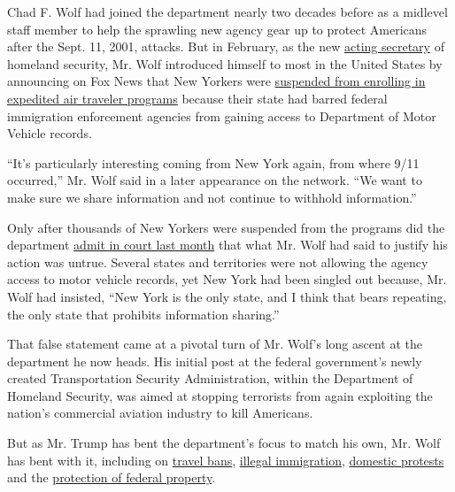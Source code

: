 Chad F. Wolf had joined the department nearly two decades before as a
midlevel staff member to help the sprawling new agency gear up to
protect Americans after the Sept. 11, 2001, attacks. But in February, as
the new
\href{https://www.nytimes.com/2019/11/01/us/politics/trump-chad-wolf-dhs.html}{acting
secretary} of homeland security, Mr. Wolf introduced himself to most in
the United States by announcing on Fox News that New Yorkers were
\href{https://www.nytimes.com/2020/02/06/us/politics/dhs-new-york-global-entry.html}{suspended
from enrolling in expedited air traveler programs} because their state
had barred federal immigration enforcement agencies from gaining access
to Department of Motor Vehicle records.

``It's particularly interesting coming from New York again, from where
9/11 occurred,'' Mr. Wolf said in a later appearance on the network.
``We want to make sure we share information and not continue to withhold
information.''

Only after thousands of New Yorkers were suspended from the programs did
the department
\href{https://www.nytimes.com/2020/07/23/nyregion/trusted-traveler-homeland-security.html}{admit
in court last month} that what Mr. Wolf had said to justify his action
was untrue. Several states and territories were not allowing the agency
access to motor vehicle records, yet New York had been singled out
because, Mr. Wolf had insisted, ``New York is the only state, and I
think that bears repeating, the only state that prohibits information
sharing.''

That false statement came at a pivotal turn of Mr. Wolf's long ascent at
the department he now heads. His initial post at the federal
government's newly created Transportation Security Administration,
within the Department of Homeland Security, was aimed at stopping
terrorists from again exploiting the nation's commercial aviation
industry to kill Americans.

But as Mr. Trump has bent the department's focus to match his own, Mr.
Wolf has bent with it, including on
\href{https://www.nytimes.com/2020/01/31/us/politics/trump-travel-ban.html}{travel
bans},
\href{https://www.nytimes.com/2020/03/20/us/politics/trump-border-coronavirus.html}{illegal
immigration},
\href{https://www.nytimes.com/2020/07/28/us/federal-agents-portland-seattle-protests.html}{domestic
protests} and the
\href{https://www.nytimes.com/2020/07/10/us/politics/homeland-security-statues-trump.html}{protection
of federal property}.


